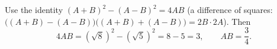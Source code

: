 Use the identity $(A+B)^2-(A-B)^2=4AB$ (a difference of squares: $\bigl((A+B)-(A-B)\bigr)\bigl((A+B)+(A-B)\bigr)=2B\cdot2A$). Then
\[
4AB=(\sqrt8)^2-(\sqrt5)^2=8-5=3,\qquad AB=\boxed{\dfrac{3}{4}}.
\]
